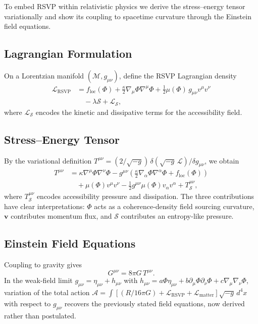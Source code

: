\documentclass[11pt, a4paper, twocolumn]{article}
\newcommand{\Sfield}{\mathcal{S}}
\begin{document}
To embed RSVP within relativistic physics we derive the stress--energy tensor
variationally and show its coupling to spacetime curvature through the Einstein
field equations.

\subsection{Lagrangian Formulation}

On a Lorentzian manifold $(\mathcal{M},g_{\mu\nu})$, define the RSVP Lagrangian
density
\begin{align*}
    \mathcal{L}_{\mathrm{RSVP}}
    &=
    f_{\mathrm{loc}}(\Phi)
    + \tfrac{\kappa}{2}\nabla_\mu\Phi\nabla^\mu\Phi
    + \tfrac{1}{2}\mu(\Phi)\,g_{\mu\nu}v^\mu v^\nu
    \\&\quad
    - \lambda\Sfield
    + \mathcal{L}_\Sfield,
\end{align*}
where $\mathcal{L}_\Sfield$ encodes the kinetic and dissipative terms for the
accessibility field.

\subsection{Stress--Energy Tensor}

By the variational definition
$T^{\mu\nu} = (2/\sqrt{-g})\,\delta(\sqrt{-g}\,\mathcal{L})/\delta g_{\mu\nu}$,
we obtain
\begin{align*}
    T^{\mu\nu}
    &=
    \kappa\nabla^\mu\Phi\nabla^\nu\Phi
    - g^{\mu\nu}\!\left(\tfrac{\kappa}{2}\nabla_\alpha\Phi\nabla^\alpha\Phi
    + f_{\mathrm{loc}}(\Phi)\right)\\
    &\quad
    + \mu(\Phi)v^\mu v^\nu
    - \tfrac{1}{2}g^{\mu\nu}\mu(\Phi)v_\alpha v^\alpha
    + T^{\mu\nu}_\Sfield,
\end{align*}
where $T^{\mu\nu}_\Sfield$ encodes accessibility pressure and dissipation.
The three contributions have clear interpretations: $\Phi$ acts as a
coherence-density field sourcing curvature, $\mathbf{v}$ contributes momentum
flux, and $\Sfield$ contributes an entropy-like pressure.

\subsection{Einstein Field Equations}

Coupling to gravity gives
\[
    G^{\mu\nu} = 8\pi G\, T^{\mu\nu}.
\]
In the weak-field limit $g_{\mu\nu} = \eta_{\mu\nu} + h_{\mu\nu}$ with
$h_{\mu\nu} = a\Phi\eta_{\mu\nu} + b\partial_\mu\Phi\partial_\nu\Phi
+ c\nabla_\mu\nabla_\nu\Phi$, variation of the total action
$\mathcal{A} = \int[(R/16\pi G) + \mathcal{L}_{\mathrm{RSVP}}
+ \mathcal{L}_{\mathrm{matter}}]\sqrt{-g}\,d^4x$
with respect to $g_{\mu\nu}$ recovers the previously stated field equations,
now derived rather than postulated.
\end{document}
